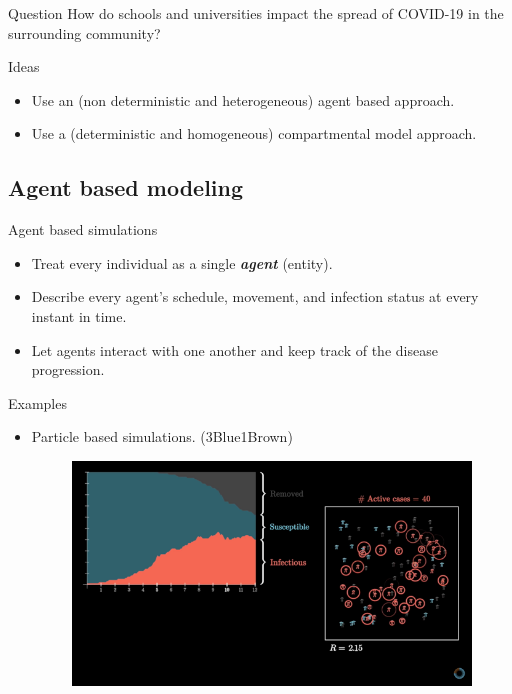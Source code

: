 \documentclass[aspectratio=169]{beamer}
\newcommand\boldgreen[1]{\textcolor{lighter_csu_green}{\emph{\textbf{#1}}}}
\begin{document}
\begin{frame}{Question}
\vfill
    \center
    \pause
    How do schools and universities impact the spread of COVID-19 in the surrounding community?
\vfill
\end{frame}


\begin{frame}{Ideas}
    \vfill
    \center
    \pause
    \begin{itemize}
        \item Use an (non deterministic and heterogeneous) agent based approach.
        \pause
        \item Use a (deterministic and homogeneous) compartmental model approach.
    \end{itemize} 
   \vfill
\end{frame}

\subsection{Agent based modeling}

\begin{frame}{Agent based simulations}
    \vfill
    \begin{itemize}
    \pause
        \item Treat every individual as a single \boldgreen{agent} (entity).
        \pause
        \item Describe every agent's schedule, movement, and infection status at every instant in time.
        \pause
        \item Let agents interact with one another and keep track of the disease progression.
    \end{itemize}
    \vfill
\end{frame}

\begin{frame}{Examples}
    \vfill
    \begin{itemize}
    \pause
        \item Particle based simulations. (3Blue1Brown)
        \vspace*{1cm}
        \begin{figure}[H]
            \centering
            \includegraphics[width=.5\textwidth]{figures/3b1b_covid_agent.png}
        \end{figure}
    \end{itemize}
    \vfill
\end{frame}
\end{document}

